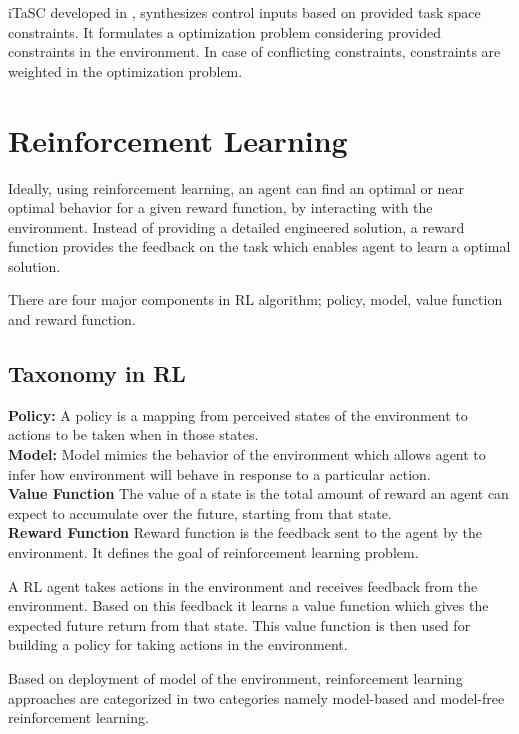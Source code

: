 \documentclass[thesis]{mas_proposal}
\begin{document}
iTaSC developed in \cite{DeSchutter-ijrr2007, DecreBruyninckxDeSchutter2013, decre09}, synthesizes control inputs based on provided task space constraints. It formulates a optimization problem considering provided constraints in the environment. In case of conflicting constraints, constraints are weighted in the optimization problem. 

\chapter{Reinforcement Learning}

Ideally, using reinforcement learning, an agent can find an optimal or near optimal behavior for a given reward function, by interacting with the environment. Instead of providing a detailed engineered solution, a reward function provides the feedback on the task which enables agent to learn a optimal solution.  

There are four major components in RL algorithm; policy, model, value function and reward function.

\section{Taxonomy in RL}

\textbf{Policy:}
A policy is a mapping from perceived states of the environment to actions to be taken when in those states. \\
\textbf{Model:}
Model mimics the behavior of the environment which allows agent to infer how environment will behave in response to a particular action. \\
\textbf{Value Function}
The value of a state is the total amount of reward an agent can expect to accumulate over the future, starting from that state. \\
\textbf{Reward Function}
Reward function is the feedback sent to the agent by the environment. It defines the goal of reinforcement learning problem.

A RL agent takes actions in the environment and receives feedback from the environment. Based on this feedback it learns a value function which gives the expected future return from that state. This value function is then used for building a policy for taking actions in the environment. 

Based on deployment of model of the environment, reinforcement learning approaches are categorized in two categories namely model-based and model-free reinforcement learning.
\end{document}
